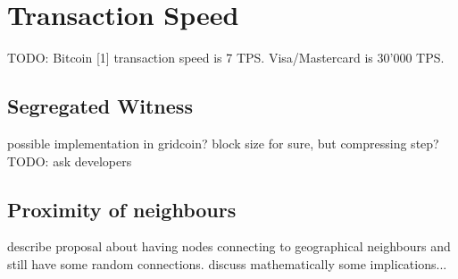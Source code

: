 \section{Transaction Speed}

TODO:
Bitcoin [1] transaction speed is 7 TPS.
Visa/Mastercard is 30'000 TPS.

\subsection{Segregated Witness}
possible implementation in gridcoin? 
block size for sure, but compressing step?
TODO: ask developers

\subsection{Proximity of neighbours}

describe proposal about having nodes connecting to geographical neighbours and still have some random connections.
discuss mathematically some implications...